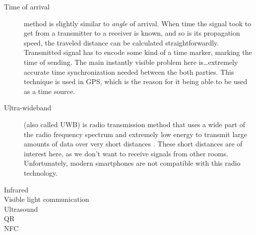 \begin{description}
	\item[Time of arrival] method is slightly similar to \emph{angle} of arrival. When time the signal took to get from a transmitter to a receiver is known, and so is its propagation speed, the traveled distance can be calculated straightforwardly. Transmitted signal has to encode some kind of a time marker, marking the time of sending. The main instantly visible problem here is\ldots extremely accurate time synchronization needed between the both parties. This technique is used in GPS, which is the reason for it being able to be used as a time source.
	
	\item[Ultra-wideband] (also called UWB) is radio transmission method that uses a wide part of the radio frequency spectrum and extremely low energy to transmit large amounts of data over very short distances \cite{ultra-wideband}. These short distances are of interest here, as we don't want to receive signals from other rooms. Unfortunately, modern smartphones are not compatible with this radio technology.
	
	\item[Infrared]
	
	\item[Visible light communication]
	
	\item[Ultrasound]
	
	\item[QR]
	
	\item[NFC]
\end{description}

